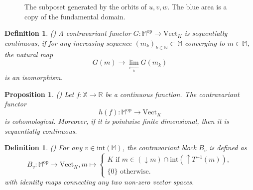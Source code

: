 \documentclass[11pt]{article}
\newtheorem{proposition}[theorem]{Proposition}
\newtheorem{definition}[theorem]{Definition}
\theoremstyle{remark}
\newcommand{\N}{\mathbb{N}}
\newcommand{\R}{\mathbb{R}}
\newcommand{\X}{\mathbb{X}}
\newcommand{\M}{\mathbb{M}}
\begin{document}
\begin{figure}
\begin{center}

\end{center}

    \caption{The subposet generated by the orbits of $u,v,w$. The blue area is a copy of the fundamental domain.}
    \label{fig:uvw}
\end{figure}


\begin{definition}(\autocite[Definition~2.4]{bauer2021structure}) A contravariant functor $G:\M^{\mathrm{op}}\rightarrow\mathrm{Vect}_K$ is \emph{sequentially continuous}, if for any increasing sequence $(m_k)_{k\in\N}\subset\M$ converging to $m\in\M$, the natural map $$G(m)\rightarrow\lim_{\xleftarrow[k]{}} G(m_k)$$ is an isomorphism.

\end{definition}

\begin{proposition}(\autocite[Proposition~2.5]{bauer2021structure})
\label{prop_seq}
Let $f : \X \longrightarrow \R$ be a continuous function. The contravariant functor $$h(f):\M^{\mathrm{op}}\rightarrow\mathrm{Vect}_K$$ is cohomological. Moreover, if it is pointwise finite dimensional, then it is sequentially continuous.
\end{proposition}

\begin{definition}(\autocite[Definition~3.2]{bauer2021structure}) For any $v\in\mathrm{int}(\M)$, the \emph{contravariant block} $B_v$ is defined as
\begin{equation*}
    B_v:\M^{\mathrm{op}}\rightarrow\mathrm{Vect}_K,m\mapsto\begin{cases}
    K \text{ if } m\in (\downarrow m)\cap \mathrm{int}(\uparrow T^{-1}(m)),\\
    \{0\} \text{ otherwise}.
    \end{cases}
\end{equation*}
with identity maps connecting any two non-zero vector spaces.
\end{definition}
\end{document}
